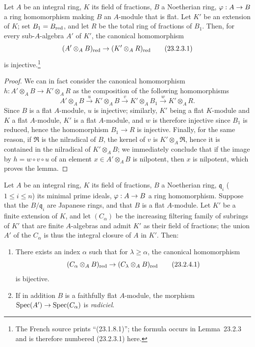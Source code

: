 \begin{lemma}[23.2.3]
\label{0.23.2.3}
Let $A$ be an integral ring, $K$ its field of fractions, $B$ a Noetherian ring, $\varphi:A\to B$ a ring homomorphism making $B$ an $A$-module that is flat.
Let $K'$ be an extension of $K$; set $B_1=B_{\mathrm{red}}$, and let $R$ be the total ring of fractions of $B_1$.
Then, for every sub-$A$-algebra $A'$ of $K'$, the canonical homomorphism
\[
\label{0.23.2.3.1}
  (A'\otimes_A B)_{\mathrm{red}}\to(K'\otimes_A R)_{\mathrm{red}}
  \tag{23.2.3.1}
\]
is injective.\footnote{The French source prints ``(23.1.8.1)''; the formula occurs in Lemma~23.2.3 and is therefore numbered (23.2.3.1) here.}
\end{lemma}

\begin{proof}
We can in fact consider the canonical homomorphism $h:A'\otimes_A B\to K'\otimes_A R$ as the composition of the following homomorphisms
\[
  A'\otimes_A B\xrightarrow{u}K'\otimes_A B\xrightarrow{v}K'\otimes_A B_1\xrightarrow{w}K'\otimes_A R.
\]
Since $B$ is a flat $A$-module, $u$ is injective; similarly, $K'$ being a flat $K$-module and $K$ a flat $A$-module, $K'$ is a flat $A$-module, and $w$ is therefore injective since $B_1$ is reduced, hence the homomorphism $B_1\to R$ is injective.
Finally, for the same reason, if $\mathfrak{R}$ is
the nilradical of $B$, the kernel of $v$ is $K'\otimes_A\mathfrak{R}$, hence it is contained in the nilradical of $K'\otimes_A B$; we immediately conclude that if the image by $h=w\circ v\circ u$ of an element $x\in A'\otimes_A B$ is nilpotent, then $x$ is nilpotent, which proves the lemma.
\end{proof}

\begin{proposition}[23.2.4]
\label{0.23.2.4}
Let $A$ be an integral ring, $K$ its field of fractions, $B$ a Noetherian ring, $\mathfrak{q}_i$ ($1\leq i\leq n$) its minimal prime ideals, $\varphi:A\to B$ a ring homomorphism.
Suppose that the $B/\mathfrak{q}_i$ are Japanese rings, and that $B$ is a flat $A$-module.
Let $K'$ be a finite extension of $K$, and let $(C_\alpha)$ be the increasing filtering family of subrings of $K'$ that are finite $A$-algebras and admit $K'$ as their field of fractions; the union $A'$ of the $C_\alpha$ is thus the integral closure of $A$ in $K'$.
Then:
\begin{enumerate}
  \item[{\rm(i)}] There exists an index $\alpha$ such that for $\lambda\geq\alpha$, the canonical homomorphism
    \[
    \label{0.23.2.4.1}
      (C_\alpha\otimes_A B)_{\mathrm{red}}\to(C_\lambda\otimes_A B)_{\mathrm{red}}
      \tag{23.2.4.1}
    \]
    is bijective.
  \item[{\rm(ii)}] If in addition $B$ is a faithfully flat $A$-module, the morphism $\operatorname{Spec}(A')\to\operatorname{Spec}(C_\alpha)$ is \emph{radiciel}.
\end{enumerate}
\end{proposition}

